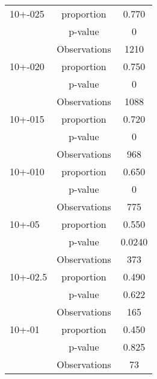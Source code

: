 \documentclass[]{article}
\begin{document}
\begin{tabular}{lcc}
	\hline
	10+-025  &  proportion  & 0.770  \\
	         &   p-value    &   0    \\
	         & Observations &  1210  \\
	10+-020  &  proportion  & 0.750  \\
	         &   p-value    &   0    \\
	         & Observations &  1088  \\
	10+-015  &  proportion  & 0.720  \\
	         &   p-value    &   0    \\
	         & Observations &  968   \\
	10+-010  &  proportion  & 0.650  \\
	         &   p-value    &   0    \\
	         & Observations &  775   \\
	10+-05   &  proportion  & 0.550  \\
	         &   p-value    & 0.0240 \\
	         & Observations &  373   \\
	10+-02.5 &  proportion  & 0.490  \\
	         &   p-value    & 0.622  \\
	         & Observations &  165   \\
	10+-01   &  proportion  & 0.450  \\
	         &   p-value    & 0.825  \\
	         & Observations &   73   \\ \hline
\end{tabular}
\end{document}
